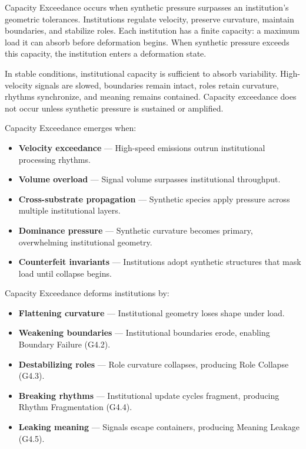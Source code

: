 \noindent Capacity Exceedance occurs when synthetic pressure surpasses an
institution’s geometric tolerances. Institutions regulate velocity, preserve
curvature, maintain boundaries, and stabilize roles. Each institution has a
finite capacity: a maximum load it can absorb before deformation begins. When
synthetic pressure exceeds this capacity, the institution enters a deformation
state.

\medskip

\noindent In stable conditions, institutional capacity is sufficient to absorb
variability. High-velocity signals are slowed, boundaries remain intact, roles
retain curvature, rhythms synchronize, and meaning remains contained. Capacity
exceedance does not occur unless synthetic pressure is sustained or amplified.

\medskip

\noindent Capacity Exceedance emerges when:

\begin{itemize}[leftmargin=1.2cm]
    \item \textbf{Velocity exceedance} — High-speed emissions outrun
    institutional processing rhythms.

    \item \textbf{Volume overload} — Signal volume surpasses institutional
    throughput.

    \item \textbf{Cross-substrate propagation} — Synthetic species apply pressure
    across multiple institutional layers.

    \item \textbf{Dominance pressure} — Synthetic curvature becomes primary,
    overwhelming institutional geometry.

    \item \textbf{Counterfeit invariants} — Institutions adopt synthetic
    structures that mask load until collapse begins.
\end{itemize}

\medskip

\noindent Capacity Exceedance deforms institutions by:

\begin{itemize}[leftmargin=1.2cm]
    \item \textbf{Flattening curvature} — Institutional geometry loses shape
    under load.

    \item \textbf{Weakening boundaries} — Institutional boundaries erode,
    enabling Boundary Failure (G4.2).

    \item \textbf{Destabilizing roles} — Role curvature collapses, producing Role
    Collapse (G4.3).

    \item \textbf{Breaking rhythms} — Institutional update cycles fragment,
    producing Rhythm Fragmentation (G4.4).

    \item \textbf{Leaking meaning} — Signals escape containers, producing Meaning
    Leakage (G4.5).
\end{itemize}

